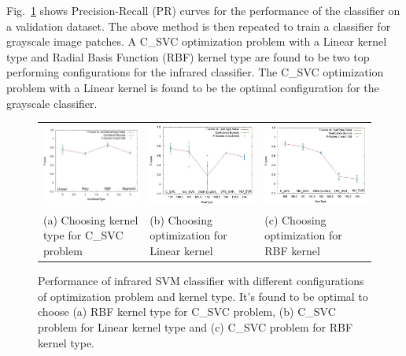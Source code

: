 \documentclass[runningheads]{llncs}
\begin{document}
Fig.~\ref{fig:k-fold} shows Precision-Recall (PR) curves for the performance of the classifier on a validation dataset. The above method is then repeated to train a classifier for grayscale image patches. A C\_SVC \cite{svm} optimization problem with a Linear kernel type and Radial Basis Function (RBF) kernel type are found to be two top performing configurations for the infrared classifier. The C\_SVC optimization problem with a Linear kernel is found to be the optimal configuration for the grayscale classifier.

\begin{figure}
  \centering
  \begin{tabular}{m{5cm}m{5cm}m{5cm}}
  \hspace{-1.5cm}
    \includegraphics[width=5cm]{img/eps/classifier/SvmKernelTypevalue_vs_score_C_SVC.eps} &
    \hspace{-1.5cm}
    \includegraphics[width=5cm]{img/eps/classifier/SvmTypevalue_vs_score_LINEAR.eps} &
    \hspace{-1.5cm}
    \includegraphics[width=5cm]{img/eps/classifier/SvmTypevalue_vs_score_RBF.eps} \\
    \hspace{-1.5cm}
    \tiny (a) Choosing kernel type for C\_SVC problem & 
    \hspace{-1.5cm}
    \tiny (b) Choosing optimization for Linear kernel &
    \hspace{-1.5cm}
    \tiny (c) Choosing optimization for RBF kernel
  \end{tabular}
  
  \caption{Performance of infrared SVM classifier with different configurations of optimization problem and kernel type. It's found to be optimal to choose (a) RBF kernel type for C\_SVC problem, (b) C\_SVC problem for Linear kernel type and (c) C\_SVC problem for RBF kernel type.}\label{fig:k-fold}
\end{figure}
\end{document}
